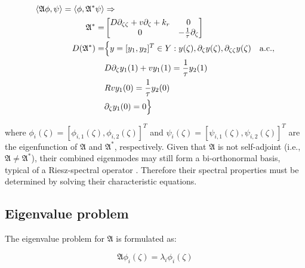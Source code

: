 \begin{equation} \label{eq:adjoint_A}
    \begin{aligned}
        \langle \mathfrak{A} \phi, \psi\rangle  = \langle \phi, {\mathfrak{A}}^{*} \psi\rangle  &\Rightarrow \\
        {\mathfrak{A}}^{*} =&
        \begin{bmatrix}
            D \partial_{\zeta \zeta} + v \partial_\zeta +k_r & 0\\
            0 & -\frac{1}{\tau} \partial_\zeta
        \end{bmatrix}\\
        D(\mathfrak{A}^*) =& \Bigl\{ y = [y_1, y_2]^T \in Y:
        y(\zeta), \partial_\zeta y(\zeta), \partial_{\zeta \zeta} y(\zeta) \quad \mathrm{a.c.},\\
        &D \partial_\zeta y_1(1) + v y_1(1) = \frac{1}{\tau} y_2(1) \\
        &R v y_1(0) = \frac{1}{\tau} y_2(0) \\
        &\partial_\zeta y_1(0) = 0 \Bigr\}
    \end{aligned}
\end{equation}

where $\phi_i(\zeta) = [\phi_{i,1}(\zeta), \phi_{i,2}(\zeta)]^T$ and $\psi_i(\zeta) = [\psi_{i,1}(\zeta), \psi_{i,2}(\zeta)]^T$ are the eigenfunction of $\mathfrak{A}$ and $\mathfrak{A}^*$, respectively. Given that $\mathfrak{A}$ is not self-adjoint (i.e., $\mathfrak{A} \neq \mathfrak{A}^*$), their combined eigenmodes may still form a bi-orthonormal basis, typical of a Riesz-spectral operator \autocite{curtainbook}. Therefore their spectral properties must be determined by solving their characteristic equations.

\subsection{Eigenvalue problem}

The eigenvalue problem\autocite{pdebook} for $\mathfrak{A}$ is formulated as:

\begin{equation} \label{eq:eig_prob}
        \mathfrak{A} \phi_i(\zeta) = \lambda_i \phi_i(\zeta)
\end{equation}

